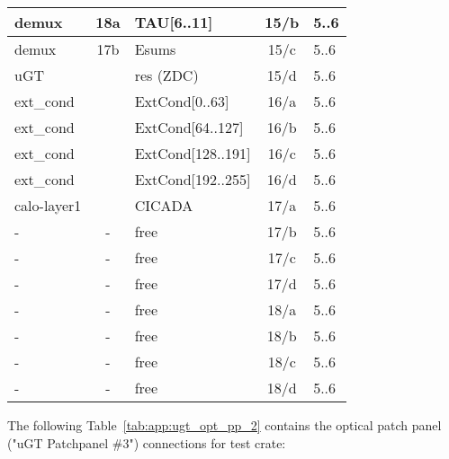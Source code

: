 \begin{longtable}{|l|c|l|c|l|}
demux & 18a & TAU[6..11] & 15/b & 5..6 \\\hline
demux & 17b & Esums      & 15/c & 5..6 \\\hline
uGT   &     & res (ZDC)  & 15/d & 5..6 \\\hline
ext\_cond &     & ExtCond[0..63]    & 16/a & 5..6 \\\hline
ext\_cond &     & ExtCond[64..127]  & 16/b & 5..6 \\\hline
ext\_cond &     & ExtCond[128..191] & 16/c & 5..6 \\\hline
ext\_cond &     & ExtCond[192..255] & 16/d & 5..6 \\\hline
calo-layer1 &   & CICADA & 17/a & 5..6 \\\hline
- & - & free & 17/b & 5..6 \\\hline
- & - & free & 17/c & 5..6 \\\hline
- & - & free & 17/d & 5..6 \\\hline
- & - & free & 18/a & 5..6 \\\hline
- & - & free & 18/b & 5..6 \\\hline
- & - & free & 18/c & 5..6 \\\hline
- & - & free & 18/d & 5..6 \\\hline
\end{longtable}

The following Table~\ref{tab:app:ugt_opt_pp_2} contains the optical patch panel ("uGT Patchpanel \#3") connections for test crate:

